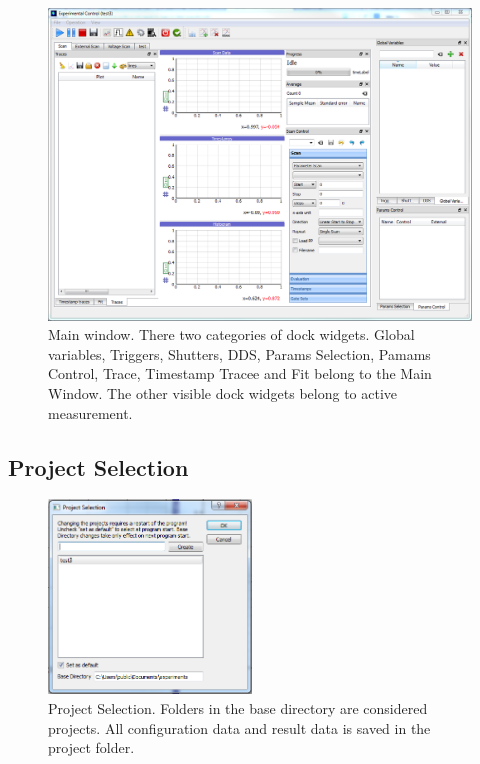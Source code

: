 \documentclass[11pt]{scrartcl}
\begin{document}
\begin{figure}[htbp]
\begin{center}
\includegraphics[width=\textwidth]{MainWindow}
\end{center}
\caption{\label{MainWindow} Main window. There two categories of dock widgets. Global variables, Triggers, Shutters, DDS, Params Selection, Pamams Control, Trace, Timestamp Tracee and Fit belong to the Main Window. The other visible dock widgets belong to active measurement.}
\end{figure}

\subsection{Project Selection}

\begin{figure}
\centering
\includegraphics[width=0.48\textwidth]{ProjectSelection}
\caption{\label{ProjectSelection} Project Selection. Folders in the base directory are considered projects. All configuration data and result data is saved in the project folder.}
\end{figure}
\end{document}
